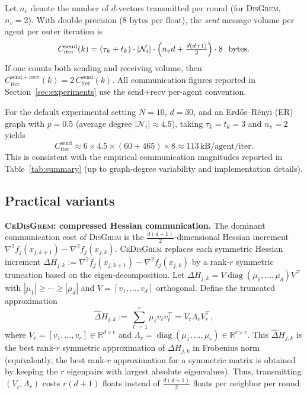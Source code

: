 \documentclass[11pt,a4paper]{article}
\newcommand{\R}{\mathbb{R}}
\begin{document}
Let $n_v$ denote the number of $d$-vectors transmitted per round (for \textsc{DisGrem}, $n_v=2$).
With double precision (8 bytes per float), the \emph{sent} message volume per agent per outer iteration is
\begin{equation}\label{eq:comm_cost_iter}
	C_{\mathrm{iter}}^{\mathrm{send}}(k)
	= (\tau_k+t_k)\cdot |\mathcal N_i|\cdot \Bigl(n_v d + \tfrac{d(d+1)}{2}\Bigr)\cdot 8 \ \ \text{bytes}.
\end{equation}
If one counts both sending and receiving volume, then
$C_{\mathrm{iter}}^{\mathrm{send+recv}}(k)=2\,C_{\mathrm{iter}}^{\mathrm{send}}(k)$.
All communication figures reported in Section~\ref{sec:experiments}
use the send+recv per-agent convention.

For the default experimental setting $N{=}10$, $d{=}30$, and an Erd\H{o}s--R\'enyi (ER)
graph with $p{=}0.5$ (average degree $|\mathcal N_i|\approx 4.5$),
taking $\tau_k=t_k=3$ and $n_v=2$ yields
\[
C_{\mathrm{iter}}^{\mathrm{send}}\!\approx\! 6\!\times\! 4.5\!\times\!(60\!+\!465)\!\times\! 8
\!\approx\! 113\,\text{kB/agent/iter}.
\]
This is consistent with the empirical communication magnitudes reported in
Table~\ref{tab:summary} (up to graph-degree variability and implementation details).
	
	\subsection{Practical variants}\label{ssec:variants}
	
\noindent\textbf{\textsc{CeDisGrem}: compressed Hessian communication.}
The dominant communication cost of \textsc{DisGrem} is the $\frac{d(d+1)}{2}$-dimensional
Hessian increment $\nabla^2 f_j(x_{j,k+1})-\nabla^2 f_j(x_{j,k})$.
\textsc{CeDisGrem} replaces each symmetric Hessian increment
$\Delta H_{j,k}:=\nabla^2 f_j(x_{j,k+1})-\nabla^2 f_j(x_{j,k})$
by a rank-$r$ symmetric truncation based on the eigen-decomposition.
Let $\Delta H_{j,k}=V\operatorname{diag}(\mu_1,\dots,\mu_d)V^\top$ with
$|\mu_1|\ge \cdots \ge |\mu_d|$ and $V=[v_1,\dots,v_d]$ orthogonal.
Define the truncated approximation
\[
\hat\Delta H_{j,k}:=\sum_{\ell=1}^r \mu_\ell v_\ell v_\ell^\top
= V_r\Lambda_r V_r^\top,
\]
where $V_r=[v_1,\dots,v_r]\in\R^{d\times r}$ and $\Lambda_r=\operatorname{diag}(\mu_1,\dots,\mu_r)\in\R^{r\times r}$.
This $\hat\Delta H_{j,k}$ is the best rank-$r$ symmetric approximation of $\Delta H_{j,k}$ in Frobenius norm
(equivalently, the best rank-$r$ approximation for a symmetric matrix is obtained by keeping the $r$
eigenpairs with largest absolute eigenvalues).
Thus, transmitting $(V_r,\Lambda_r)$ costs $r(d+1)$ floats instead of $\frac{d(d+1)}{2}$ floats per neighbor per round.
\end{document}
